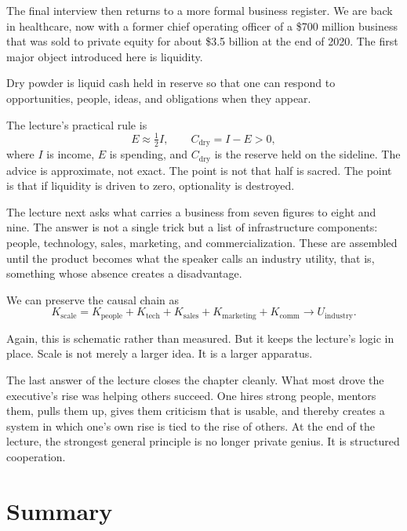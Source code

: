 The final interview then returns to a more formal business register. We are back in healthcare, now with a former chief operating officer of a \$700 million business that was sold to private equity for about \$3.5 billion at the end of 2020. The first major object introduced here is liquidity.

\begin{definition}
Dry powder is liquid cash held in reserve so that one can respond to opportunities, people, ideas, and obligations when they appear.
\end{definition}

The lecture's practical rule is
\begin{equation}
E \approx \tfrac12 I,
\qquad
C_{\mathrm{dry}} = I - E > 0,
\end{equation}
where \(I\) is income, \(E\) is spending, and \(C_{\mathrm{dry}}\) is the reserve held on the sideline. The advice is approximate, not exact. The point is not that half is sacred. The point is that if liquidity is driven to zero, optionality is destroyed.

The lecture next asks what carries a business from seven figures to eight and nine. The answer is not a single trick but a list of infrastructure components: people, technology, sales, marketing, and commercialization. These are assembled until the product becomes what the speaker calls an industry utility, that is, something whose absence creates a disadvantage.

We can preserve the causal chain as
\begin{equation}
K_{\mathrm{scale}}
=
K_{\mathrm{people}}
+
K_{\mathrm{tech}}
+
K_{\mathrm{sales}}
+
K_{\mathrm{marketing}}
+
K_{\mathrm{comm}}
\longrightarrow
U_{\mathrm{industry}}.
\end{equation}

Again, this is schematic rather than measured. But it keeps the lecture's logic in place. Scale is not merely a larger idea. It is a larger apparatus.

The last answer of the lecture closes the chapter cleanly. What most drove the executive's rise was helping others succeed. One hires strong people, mentors them, pulls them up, gives them criticism that is usable, and thereby creates a system in which one's own rise is tied to the rise of others. At the end of the lecture, the strongest general principle is no longer private genius. It is structured cooperation.

\section{Summary}

